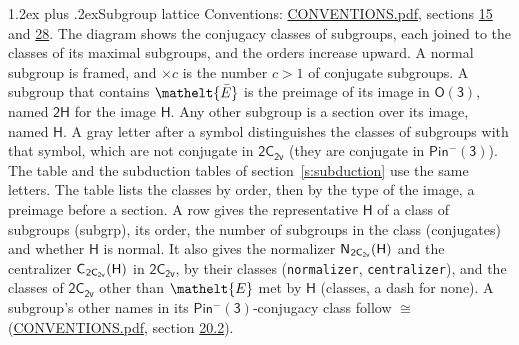 \documentclass[10pt,a4paper]{article}
\makeatletter
\renewcommand\section{\@startsection{section}{1}{\z@}{-3ex plus -1ex minus -.2ex}%
  {1.2ex plus .2ex}{\normalfont\large\sffamily\bfseries\color{parttitle}}}
\numberwithin{equation}{section}
\newcommand{\eltfont}[1]{{\let\sigma\eltsigma\mathelt{#1}}}
\newcommand{\grp}[1]{\mathsf{#1}}
\newcommand{\cls}[1]{\eltfont{#1}}
\newcommand{\elt}[1]{\eltfont{#1}}
\newcommand{\samecls}{\cong}
\newcommand{\clsletter}[1]{\,{\scriptsize\color{black!55}#1}}
\newcommand{\barred}[1]{\bar{#1}}
\newcommand{\hairsp}{\mkern1mu}
\makeatother
\begin{document}
\section{Subgroup lattice}\label{s:subgroups}
Conventions: \href{../../CONVENTIONS.pdf}{CONVENTIONS.pdf}, sections \href{../../../rotation/CONVENTIONS.pdf\#conv.15}{15} and \href{../../CONVENTIONS.pdf\#conv.28}{28}.
The diagram shows the conjugacy classes of subgroups, each joined to the classes of its maximal subgroups, and the orders increase upward. \label{n:index.conjugates.c}A normal subgroup is framed, and ${\times}c$ is the number $c > 1$ of conjugate subgroups. \label{n:group.H}A subgroup that contains $\elt{\barred{E}}$ is the preimage of its image in $\grp{O(3)}$, named $\grp{2H}$ for the image $\grp{H}$. Any other subgroup is a section over its image, named $\grp{H}$. \label{n:mark.letter}A gray letter after a symbol distinguishes the classes of subgroups with that symbol, which are not conjugate in $\grp{2C_{2v}}$ (they are conjugate in \href{Pinminus3.pdf}{$\grp{Pin^{-}(3)}$}). The table and the subduction tables of section~\ref{s:subduction} use the same letters. The table lists the classes by order, then by the type of the image, a preimage before a section. \label{n:head.subgroup}\label{n:head.order}\label{n:head.conjugates}\label{n:head.normal}A row gives the representative $\grp{H}$ of a class of subgroups (subgrp), its order, the number of subgroups in the class (conjugates) and whether $\grp{H}$ is normal. \label{n:group.normalizer}\label{n:group.centralizer}\label{n:head.classes}It also gives the normalizer $\grp{N}_{\hairsp \grp{2C_{2v}}}(\grp{H})$ and the centralizer $\grp{C}_{\hairsp \grp{2C_{2v}}}(\grp{H})$ in $\grp{2C_{2v}}$, by their classes (\texttt{normalizer}, \texttt{centralizer}), and the classes of $\grp{2C_{2v}}$ other than $\cls{E}$ met by $\grp{H}$ (classes, a dash for none). A subgroup's other names in its \href{Pinminus3.pdf}{$\grp{Pin^{-}(3)}$}-conjugacy class follow $\samecls$ (\href{../../CONVENTIONS.pdf}{CONVENTIONS.pdf}, section \href{../../CONVENTIONS.pdf\#conv.20.2}{20.2}).
\begin{center}
\end{center}
\end{document}
